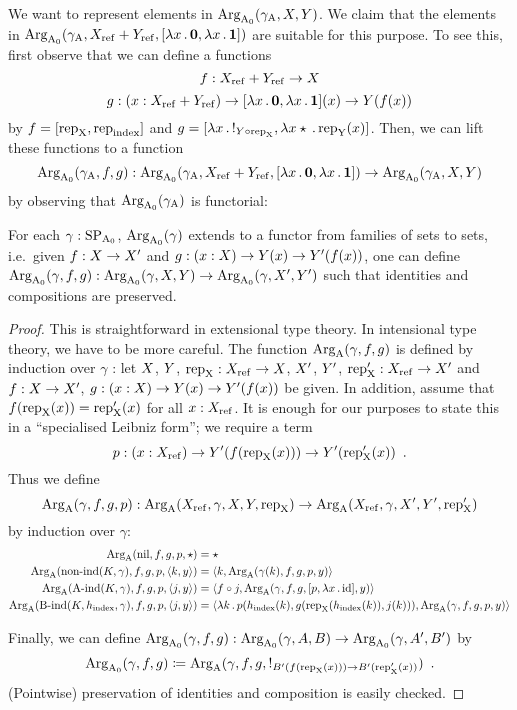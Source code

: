 \documentclass{article}
\begin{document}

We want to represent elements in $\text{Arg}_{\mathrm{A}_0}(\gamma_{\mathrm{A}}, X, Y)$. We claim that
the elements in $\text{Arg}_{\mathrm{A}_0}(\gamma_{\mathrm{A}}, X_{\mathrm{ref}} + Y_{\mathrm{ref}}, [\lambda x\,.\,\mathbf{0},
\lambda x\,.\,\mathbf{1}])$ are suitable for this purpose. To see this,
first observe that we can define a functions
\[
f : X_{\mathrm{ref}} + Y_{\mathrm{ref}} \to X
\]
%
%
\[
g : (x : X_{\mathrm{ref}} + Y_{\mathrm{ref}}) \to
    [\lambda x\,.\,\mathbf{0}, \lambda x\,.\,\mathbf{1}](x)
      \to Y(f(x))
\]
%
by $f = [\text{rep}_{\mathrm{X}}, \text{rep}_{\mathrm{index}}]$ and $g = [\lambda x\,.\,!_{Y \circ
  \text{rep}_{\mathrm{X}}}, \lambda x \star\,.\, \text{rep}_{\mathrm{Y}}(x)]$. Then, we can lift these
functions to a function
%
\[
\text{Arg}_{\mathrm{A}_0}(\gamma_{\mathrm{A}}, f, g) : \text{Arg}_{\mathrm{A}_0}(\gamma_{\mathrm{A}}, X_{\mathrm{ref}} +Y_{\mathrm{ref}}, [\lambda x\,.\,\mathbf{0}, \lambda x\,.\,\mathbf{1}]) \to
                       \text{Arg}_{\mathrm{A}_0}(\gamma_{\mathrm{A}}, X, Y)
\]
%
by observing that $\text{Arg}_{\mathrm{A}_0}(\gamma_{\mathrm{A}})$ is functorial:

\begin{lemma} %
  For each $\gamma : \text{SP}_{\mathrm{A}_0}$, $\text{Arg}_{\mathrm{A}_0}(\gamma)$ extends to a functor from
  families of sets to sets, i.e.\ given $f : X \to X'$ and $g : (x :
  X) \to Y(x) \to Y'(f(x))$, one can define $\text{Arg}_{\mathrm{A}_0}(\gamma, f, g) :
  \text{Arg}_{\mathrm{A}_0}(\gamma, X, Y) \to \text{Arg}_{\mathrm{A}_0}(\gamma, X', Y')$ such that identities
  and compositions are preserved.
\end{lemma}
\begin{proof}
  This is straightforward in extensional type theory. In intensional
  type theory, we have to be more careful. The function $\text{Arg}_{\mathrm{A}}(\gamma,
  f, g)$ is defined by induction over $\gamma$%
: let $X$,
  $Y$, $\text{rep}_{\mathrm{X}} : X_{\mathrm{ref}} \to X$, $X'$, $Y'$, $\text{rep}_{\mathrm{X}}' : X_{\mathrm{ref}} \to X'$ and
  $f : X \to X'$, $g : (x : X) \to Y(x) \to Y'(f(x))$ be given. In
  addition, assume that $f(\text{rep}_{\mathrm{X}}(x)) = \text{rep}_{\mathrm{X}}'(x)$ for all $x :
  X_{\mathrm{ref}}$. It is enough for our purposes to state this in a
  ``specialised Leibniz form''; we require a term
  \[
  p : (x : X_{\mathrm{ref}}) \to Y'(f(\text{rep}_{\mathrm{X}}(x))) \to Y'(\text{rep}_{\mathrm{X}}'(x)) \enspace .
  \]
  Thus we define
  \[
  \ArgA(\gamma, f, g, p) : %
  \ArgA(\Xref, \gamma, \A, \B, \repA)
  \to \ArgA(\Xref, \gamma, \A', \B', \repA')
  \]
  by induction over $\gamma$:
  \begin{align*}
    \text{Arg}_{\mathrm{A}}(\text{nil}, f, g, p, \star) &= \star\\
    \text{Arg}_{\mathrm{A}}(\text{non-ind}(K, \gamma), f, g, p, \langle k , y\rangle) &= \langle k , \text{Arg}_{\mathrm{A}}(\gamma(k), f, g, p, y)\rangle\\
    \text{Arg}_{\mathrm{A}}(\text{A-ind}(K, \gamma), f, g, p, \langle j , y\rangle) &= \langle f \circ j , \text{Arg}_{\mathrm{A}}(\gamma, f, g, [p, \lambda x\,.\,\text{id}], y)\rangle\\
    \text{Arg}_{\mathrm{A}}(\text{B-ind}(K, h_{\mathrm{index}}, \gamma), f, g, p, \langle j , y\rangle) &= \langle \lambda k\,.\,p(h_{\mathrm{index}}(k), g(\text{rep}_{\mathrm{X}}(h_{\mathrm{index}}(k)), j(k))) , \text{Arg}_{\mathrm{A}}(\gamma, f, g, p, y)\rangle
  \end{align*}
  
  Finally, we can define $\text{Arg}_{\mathrm{A}_0}(\gamma, f, g) : \text{Arg}_{\mathrm{A}_0}(\gamma, A, B) \to
  \text{Arg}_{\mathrm{A}_0}(\gamma, A', B')$ by
  \[
  \text{Arg}_{\mathrm{A}_0}(\gamma, f, g) \coloneqq \text{Arg}_{\mathrm{A}}(\gamma,f, g, !_{B'(f(\text{rep}_{\mathrm{X}}(x))) \to B'(\text{rep}_{\mathrm{X}}'(x))}) \enspace .
  \]
  (Pointwise) preservation of identities and composition is easily checked.
\end{proof}
\end{document}
